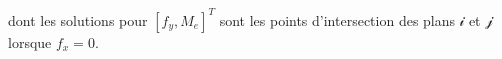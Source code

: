 dont les solutions pour $[f_y,M_e]^T$ sont les points d'intersection des plans $\mathcal{i}$ et $\mathcal{j}$ lorsque $f_x=0$.
